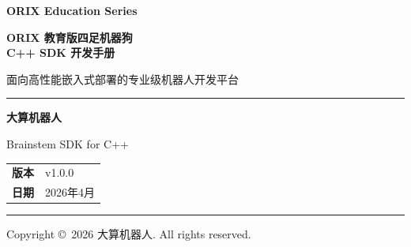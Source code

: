 \documentclass[a4paper,11pt,openany]{book}
\begin{document}
\begin{titlepage}
\begin{center}

\noindent\colorbox{brandteal}{%
  \parbox{\dimexpr\textwidth-2\fboxsep}{%
    \vspace{0.6cm}
    \centering\color{white}\Large\bfseries ORIX Education Series
    \vspace{0.6cm}
  }%
}

\vspace{2.5cm}

{\Huge\bfseries\color{brandteal} ORIX 教育版四足机器狗\\[0.5em] C++ SDK 开发手册}

\vspace{0.8cm}

{\large\color{brandslate} 面向高性能嵌入式部署的专业级机器人开发平台}

\vspace{1.5cm}

{\color{brandteal}\rule{0.6\textwidth}{1.2pt}}

\vspace{1.5cm}

{\LARGE\bfseries 大算机器人}

\vspace{0.8cm}

{\Large\color{brandslate} Brainstem SDK for C++}

\vspace{2cm}

\begin{tabular}{rl}
\textbf{版本} & v1.0.0 \\
\textbf{日期} & 2026年4月 \\
\end{tabular}

\vfill

{\color{brandteal}\rule{\textwidth}{0.8pt}}
\vspace{0.3cm}

{\small\color{brandslate} Copyright \copyright\ 2026 大算机器人. All rights reserved.}

\end{center}
\end{titlepage}
\end{document}

